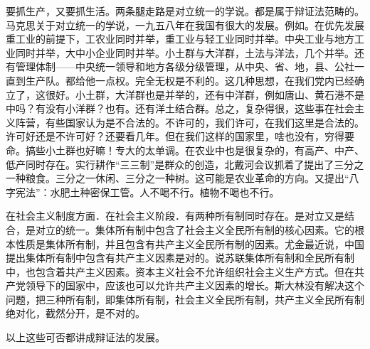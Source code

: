要抓生产，又要抓生活。两条腿走路是对立统一的学说。都是属于辩证法范畴的。马克思关于对立统一的学说，一九五八年在我国有很大的发展。例如。在优先发展重工业的前提下，工农业同时并举，重工业与轻工业同时并举。中央工业与地方工业同时并举，大中小企业同时并举。小土群与大洋群，土法与洋法，几个并举。还有管理体制——中央统一领导和地方各级分级管理，从中央、省、地，县、公社一直到生产队。都给他一点权。完全无权是不利的。这几种思想，在我们党内已经确立了，这很好。小土群，大洋群也是并举的，还有中洋群，例如唐山、黄石港不是中吗？有没有小洋群？也有。还有洋土结合群。总之，复杂得很，这些事在社会主义阵营，有些国家认为是不合法的。不许可的，我们许可，在我们这里是合法的。许可好还是不许可好？还要看几年。但在我们这样的国家里，啥也没有，穷得要命。搞些小土群也好嘛！专大的太单调。在农业中也是很复杂的，有高产、中产、低产同时存在。实行耕作“三三制”是群众的创造，北戴河会议抓着了提出了三分之一种粮食。三分之一休闲、三分之一种树。这可能是农业革命的方向。又提出“八字宪法”：水肥土种密保工管。人不喝不行。植物不喝也不行。

在社会主义制度方面．在社会主义阶段．有两种所有制同时存在。是对立又是结合，是对立的统一。集体所有制中包含了社会主义全民所有制的核心因素。它的根本性质是集体所有制，并且包含有共产主义全民所有制的因素。尤金最近说，中国提出集体所有制中包含有共产主义因素是对的。说苏联集体所有制和全民所有制中，也包含着共产主义因素。资本主义社会不允许组织社会主义生产方式。但在共产党领导下的国家中，应该也可以允许共产主义因素的增长。斯大林没有解决这个问题，把三种所有制，即集体所有制，社会主义全民所有制，共产主义全民所有制绝对化，截然分开，是不对的。

以上这些可否都讲成辩证法的发展。

